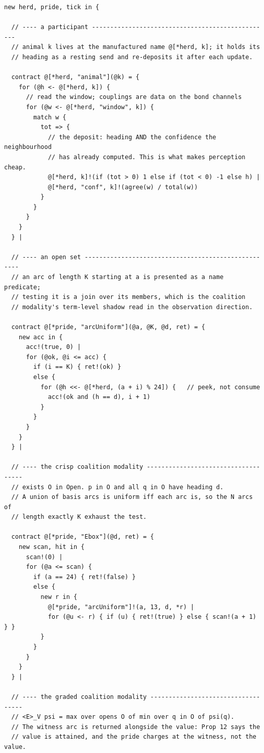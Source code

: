 \documentclass[11pt,a4paper]{article}
\theoremstyle{plain}
\theoremstyle{definition}
\theoremstyle{remark}
\begin{document}
\begin{lstlisting}
new herd, pride, tick in {

  // ---- a participant -------------------------------------------------
  // animal k lives at the manufactured name @[*herd, k]; it holds its
  // heading as a resting send and re-deposits it after each update.

  contract @[*herd, "animal"](@k) = {
    for (@h <- @[*herd, k]) {
      // read the window; couplings are data on the bond channels
      for (@w <- @[*herd, "window", k]) {
        match w {
          tot => {
            // the deposit: heading AND the confidence the neighbourhood
            // has already computed. This is what makes perception cheap.
            @[*herd, k]!(if (tot > 0) 1 else if (tot < 0) -1 else h) |
            @[*herd, "conf", k]!(agree(w) / total(w))
          }
        }
      }
    }
  } |

  // ---- an open set ----------------------------------------------------
  // an arc of length K starting at a is presented as a name predicate;
  // testing it is a join over its members, which is the coalition
  // modality's term-level shadow read in the observation direction.

  contract @[*pride, "arcUniform"](@a, @K, @d, ret) = {
    new acc in {
      acc!(true, 0) |
      for (@ok, @i <= acc) {
        if (i == K) { ret!(ok) }
        else {
          for (@h <<- @[*herd, (a + i) % 24]) {   // peek, not consume
            acc!(ok and (h == d), i + 1)
          }
        }
      }
    }
  } |

  // ---- the crisp coalition modality ------------------------------------
  // exists O in Open. p in O and all q in O have heading d.
  // A union of basis arcs is uniform iff each arc is, so the N arcs of
  // length exactly K exhaust the test.

  contract @[*pride, "Ebox"](@d, ret) = {
    new scan, hit in {
      scan!(0) |
      for (@a <= scan) {
        if (a == 24) { ret!(false) }
        else {
          new r in {
            @[*pride, "arcUniform"]!(a, 13, d, *r) |
            for (@u <- r) { if (u) { ret!(true) } else { scan!(a + 1) } }
          }
        }
      }
    }
  } |

  // ---- the graded coalition modality -----------------------------------
  // <E>_V psi = max over opens O of min over q in O of psi(q).
  // The witness arc is returned alongside the value: Prop 12 says the
  // value is attained, and the pride charges at the witness, not the value.


\end{lstlisting}
\end{document}
